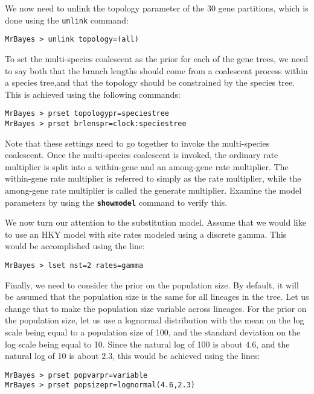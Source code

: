 \documentclass[12pt]{book}
\newcommand{\ttt}[1]{\texttt{#1}}
\newcommand{\tb}[1]{\ttt{\textbf{#1}}}
\begin{document}
We now need to unlink the topology parameter of the 30 gene partitions, which is done using the
\texttt{unlink} command:

\begin{Verbatim}
MrBayes > unlink topology=(all)
\end{Verbatim}

To set the multi-species coalescent as the prior for each of the gene trees, we need to say both
that the branch lengths should come from a coalescent process within a species tree,and that the
topology should be constrained by the species tree. This is achieved using the following commands:

\begin{Verbatim}
MrBayes > prset topologypr=speciestree
MrBayes > prset brlenspr=clock:speciestree
\end{Verbatim}

Note that these settings need to go together to invoke the multi-species coalescent. Once the
multi-species coalescent is invoked, the ordinary rate multiplier is split into a within-gene and
an among-gene rate multiplier. The within-gene rate multiplier is referred to simply as the rate
multiplier, while the among-gene rate multiplier is called the generate multiplier. Examine the
model parameters by using the \tb{showmodel} command to verify this.

We now turn our attention to the substitution model. Assume that we would like to use an HKY model
with site rates modeled using a discrete gamma. This would be accomplished using the line:

\begin{Verbatim}
MrBayes > lset nst=2 rates=gamma
\end{Verbatim}

Finally, we need to consider the prior on the population size. By default, it will be assumed that
the population size is the same for all lineages in the tree. Let us change that to make the
population size variable across lineages. For the prior on the population size, let us use a
lognormal distribution with the mean on the log scale being equal to a population size of 100, and
the standard deviation on the log scale being equal to 10. Since the natural log of 100 is about
$4.6$, and the natural log of 10 is about $2.3$, this would be achieved using the lines:

\begin{Verbatim}
MrBayes > prset popvarpr=variable
MrBayes > prset popsizepr=lognormal(4.6,2.3)
\end{Verbatim}
\end{document}
